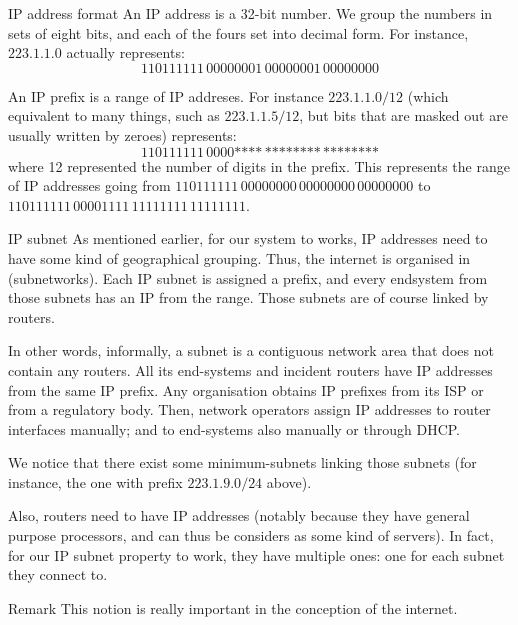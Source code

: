 \documentclass[a4paper]{article}
\begin{document}
\begin{parag}{IP address format}
    An IP address is a 32-bit number. We group the numbers in sets of eight bits, and each of the fours set into decimal form. For instance, $223.1.1.0$ actually represents: 
    \[110111111\,00000001\,00000001\,00000000\]
    
    An IP prefix is a range of IP addreses. For instance $223.1.1.0/12$ (which equivalent to many things, such as $223.1.1.5/12$, but bits that are masked out are usually written by zeroes) represents:
    \[110111111\,0000\text{****}\,\text{********}\,\text{********}\]
    where 12 represented the number of digits in the prefix. This represents the range of IP addresses going from $110111111\,00000000\,00000000\,00000000$ to $110111111\,00001111\,11111111\,11111111$.
\end{parag}

\begin{parag}{IP subnet}
    As mentioned earlier, for our system to works, IP addresses need to have some kind of geographical grouping. Thus, the internet is organised in  (subnetworks). Each IP subnet is assigned a prefix, and every endsystem from those subnets has an IP from the range. Those subnets are of course linked by routers.


    In other words, informally, a subnet is a contiguous network area that does not contain any routers. All its end-systems and incident routers have IP addresses from the same IP prefix. Any organisation obtains IP prefixes from its ISP or from a regulatory body. Then, network operators assign IP addresses to router interfaces manually; and to end-systems also manually or through DHCP.

    We notice that there exist some minimum-subnets linking those subnets (for instance, the one with prefix $223.1.9.0/24$ above).
    
    Also, routers need to have IP addresses (notably because they have general purpose processors, and can thus be considers as some kind of servers). In fact, for our IP subnet property to work, they have multiple ones: one for each subnet they connect to.

    \begin{subparag}{Remark}
        This notion is really important in the conception of the internet.
    \end{subparag}
\end{parag}
\end{document}
